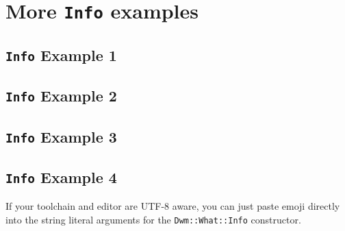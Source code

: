 \chapter{More \texttt{Info} examples}

\section{\texttt{Info} Example 1}


\section{\texttt{Info} Example 2}


\section{\texttt{Info} Example 3}


\section{\texttt{Info} Example 4}
If your toolchain and editor are UTF-8 aware, you can just paste
emoji directly into the string literal arguments for the
\texttt{Dwm::What::Info} constructor.




